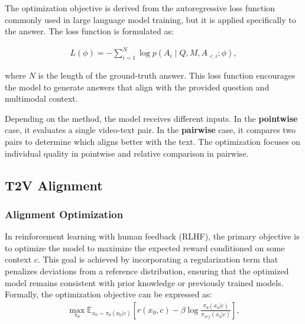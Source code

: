 The optimization objective is derived from the autoregressive loss function commonly used in large language model training, but it is applied specifically to the answer. The loss function is formulated as:

\vspace{-4pt}
\small
\begin{align}
    L(\phi) = -\sum^N_{i=1} \log p(A_i \mid Q, M, A_{<i}; \phi),
\end{align}
\normalsize
\vspace{-4pt}

where $N$ is the length of the ground-truth answer. This loss function encourages the model to generate answers that align with the provided question and multimodal context.

Depending on the method, the model receives different inputs. In the \textbf{pointwise} case, it evaluates a single video-text pair. In the \textbf{pairwise} case, it compares two pairs to determine which aligns better with the text. The optimization focuses on individual quality in pointwise and relative comparison in pairwise.

\subsection{T2V Alignment}

\subsubsection{Alignment Optimization}
In reinforcement learning with human feedback (RLHF), the primary objective is to optimize the model to maximize the expected reward conditioned on some context \( c \). This goal is achieved by incorporating a regularization term that penalizes deviations from a reference distribution, ensuring that the optimized model remains consistent with prior knowledge or previously trained models. Formally, the optimization objective can be expressed as:
\small
\begin{multline}
    \max_{\pi_\theta} \mathbb{E}_{x_0 \sim \pi_\theta(x_0|c)} \left[ r(x_0, c)
    - \beta \log \frac{\pi_\theta(x_0|c)}{\pi_{ref}(x_0|c)} \right] ,
    \label{eq:objective}
\end{multline}
\normalsize

